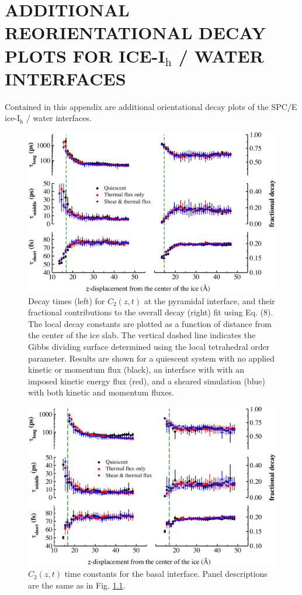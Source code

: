 \chapter{ADDITIONAL REORIENTATIONAL DECAY PLOTS FOR ICE-I$_\mathrm{h}$ / WATER INTERFACES}\label{dynamicAppendix}

Contained in this appendix are additional orientational decay plots of the SPC/E ice-I$_\mathrm{h}$ / water interfaces.



\begin{figure}
\includegraphics[width=\linewidth]{Figures/Pyr_lcorrz}
\caption{\label{fig:Pyrorient} Decay times (left) for $C_2(z,t)$ at
  the pyramidal interface, and their fractional contributions to the
  overall decay (right) fit using Eq. (8). The local decay constants
  are plotted as a function of distance from the center of the ice
  slab. The vertical dashed line indicates the Gibbs dividing surface
  determined using the local tetrahedral order parameter.  Results are
  shown for a quiescent system with no applied kinetic or momentum
  flux (black), an interface with with an imposed kinetic energy flux
  (red), and a sheared simulation (blue) with both kinetic and
  momentum fluxes.}
\end{figure}

\begin{figure}
\includegraphics[width=\linewidth]{Figures/Bas_lcorrz}
\caption{\label{fig:Borient} $C_2(z,t)$ time constants for the basal
  interface.  Panel descriptions are the same as in
  Fig. \ref{fig:Pyrorient}. }
\end{figure}

